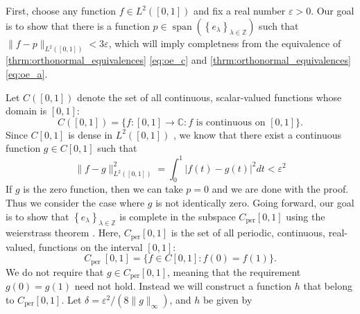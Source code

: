 \documentclass[../thesis.tex]{subfiles}
\begin{document}
First, choose any function $f\in L^2([0,1])$ and fix a real number $\varepsilon >0$. Our goal is to show that there is a function $p \in \operatorname{span} \left( \left\{ e_{\lambda} \right\}_{\lambda\in \mathbb{Z}} \right)$ such that $\|f-p\|_{L^2([0,1])} < 3 \varepsilon$, which will imply completness from the equivalence of \cref{thrm:orthonormal_equivalences} \cref{eq:oe_c} and \cref{thrm:orthonormal_equivalences} \cref{eq:oe_a}.

Let $C([0,1])$ denote the set of all continuous, scalar-valued functions whose domain is $[0,1]$:
\begin{equation}
    C([0,1])=\{f:[0,1] \rightarrow \mathbb{C}: f \text{ is continuous on } [0,1]\}.
\end{equation}
Since $C[0,1]$ is dense in $L^2([0,1])$ \cite{heilMetricsNormsInner2018}, we know that there exist a continuous function $g \in C[0,1]$ such that %
\begin{equation}
    \| f-g \|_{L^2([0,1])}^2 = \int_0^1 \left|f(t)-g(t) \right|^2dt < \varepsilon^2
\end{equation}
If $g$ is the zero function, then we can take $p=0$ and we are done with the proof. Thus we consider the case where $g$ is not identically zero. Going forward, our goal is to show that $\left\{ e_{\lambda} \right\}_{\lambda\in \mathbb{Z}}$ is complete in the subspace $C_{\text{per}}[0,1]$ using the weierstrass theorem \cite{durenInvitationClassicalAnalysis2012}. Here, $C_{\text{per}}[0,1]$ is the set of all periodic, continuous, real-valued, functions on the interval $[0,1]$:
\begin{equation*}
C_{\text {per }}[0,1]=\{f \in C[0,1]: f(0)=f(1)\}.
\end{equation*}
We do not require that $g \in C_{\text{per}}[0,1]$, meaning that the requirement $g(0)=g(1)$ need not hold. Instead we will construct a function $h$ that belong to $C_{\text{per}}[0,1]$. Let  $\delta = \varepsilon^2/(8\|g\|_\infty)$, and $h$  be given by %
\end{document}

